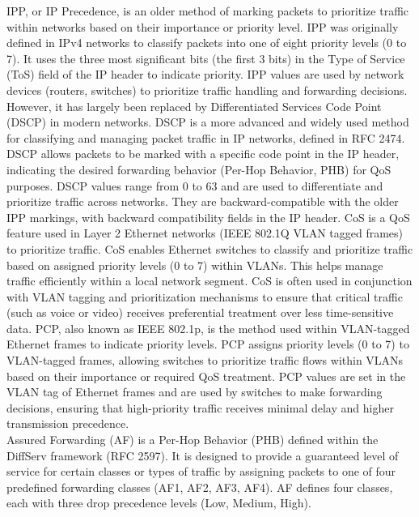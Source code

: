 \documentclass{article}
\begin{document}
	IPP, or IP Precedence, is an older method of marking packets to prioritize traffic within networks based on their importance or priority level. IPP was originally defined in IPv4 networks to classify packets into one of eight priority levels (0 to 7). It uses the three most significant bits (the first 3 bits) in the Type of Service (ToS) field of the IP header to indicate priority. IPP values are used by network devices (routers, switches) to prioritize traffic handling and forwarding decisions. However, it has largely been replaced by Differentiated Services Code Point (DSCP) in modern networks. DSCP is a more advanced and widely used method for classifying and managing packet traffic in IP networks, defined in RFC 2474. DSCP allows packets to be marked with a specific code point in the IP header, indicating the desired forwarding behavior (Per-Hop Behavior, PHB) for QoS purposes. DSCP values range from 0 to 63 and are used to differentiate and prioritize traffic across networks. They are backward-compatible with the older IPP markings, with backward compatibility fields in the IP header. CoS is a QoS feature used in Layer 2 Ethernet networks (IEEE 802.1Q VLAN tagged frames) to prioritize traffic. CoS enables Ethernet switches to classify and prioritize traffic based on assigned priority levels (0 to 7) within VLANs. This helps manage traffic efficiently within a local network segment. CoS is often used in conjunction with VLAN tagging and prioritization mechanisms to ensure that critical traffic (such as voice or video) receives preferential treatment over less time-sensitive data.  PCP, also known as IEEE 802.1p, is the method used within VLAN-tagged Ethernet frames to indicate priority levels. PCP assigns priority levels (0 to 7) to VLAN-tagged frames, allowing switches to prioritize traffic flows within VLANs based on their importance or required QoS treatment. PCP values are set in the VLAN tag of Ethernet frames and are used by switches to make forwarding decisions, ensuring that high-priority traffic receives minimal delay and higher transmission precedence.\\
	
	Assured Forwarding (AF) is a Per-Hop Behavior (PHB) defined within the DiffServ framework (RFC 2597). It is designed to provide a guaranteed level of service for certain classes or types of traffic by assigning packets to one of four predefined forwarding classes (AF1, AF2, AF3, AF4). AF defines four classes, each with three drop precedence levels (Low, Medium, High).\\
	
\end{document}
